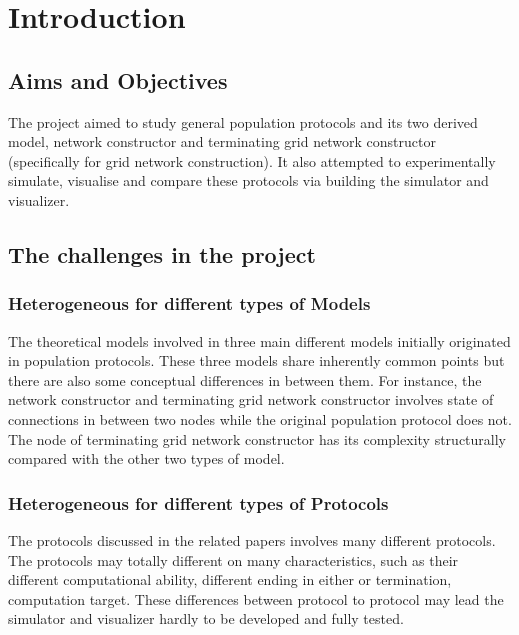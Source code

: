 \section{Introduction}
\subsection{Aims and Objectives}
\par
The project aimed to study general population protocols \cite{AspnesR2007} and
its two derived model,
network constructor \cite{MS16a} and terminating grid network constructor \cite{Mi17}
(specifically for grid network construction).
It also attempted to experimentally simulate, visualise and compare these protocols
via building the simulator and visualizer.

\subsection{The challenges in the project}
\subsubsection{Heterogeneous for different types of Models}
\par
The theoretical models involved in three main different models initially originated in
population protocols. These three models share inherently common points but there are also some
conceptual differences in between them. For instance, the network constructor \cite{MS16a} and terminating
grid network constructor \cite{Mi17}
involves state of connections in between two nodes while the original population protocol does not.
The node of terminating grid network constructor has its complexity structurally compared with
the other two types of model.

\subsubsection{Heterogeneous for different types of Protocols}
\par
The protocols discussed in the related papers \cite{AspnesR2007, MS16a, Mi17} involves
many different protocols. The protocols may totally different on many characteristics,
such as their different computational ability, different ending in either or termination,
computation target. These differences between
protocol to protocol may lead the simulator and visualizer hardly to be developed and
fully tested.

